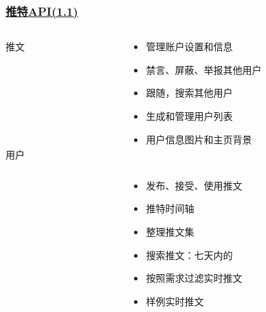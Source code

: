 \documentclass[../Postbot.tex]{subfiles}
\begin{document}
	\begin{frame}
		\frametitle{\href{https://developer.twitter.com/en/products/twitter-api}{推特API(1.1)}}
		\begin{columns}
			\begin{column}{.2\textwidth}
				\centering
				{\normalsize 推文} \\
				\hspace*{\fill} \\
				\hspace*{\fill} \\
				\hspace*{\fill} \\
				\hspace*{\fill} \\
				\hspace*{\fill} \\
				\hspace*{\fill} \\
				\hspace*{\fill} \\
				{\normalsize 用户} \\
				\hspace*{\fill} \\
				\hspace*{\fill} \\
			\end{column}

			\begin{column}{.7\textwidth}
				\begin{itemize}
					\item 管理账户设置和信息
					\item 禁言、屏蔽、举报其他用户
					\item 跟随，搜索其他用户
					\item 生成和管理用户列表
					\item 用户信息图片和主页背景
				\end{itemize}
				\hspace*{\fill} \\
				\begin{itemize}
					\item 发布、接受、使用推文
					\item 推特时间轴
					\item 整理推文集
					\item 搜索推文：七天内的
					\item 按照需求过滤实时推文
					\item 样例实时推文
				\end{itemize}
			\end{column}
			
		\end{columns}
	\end{frame}
\end{document}
